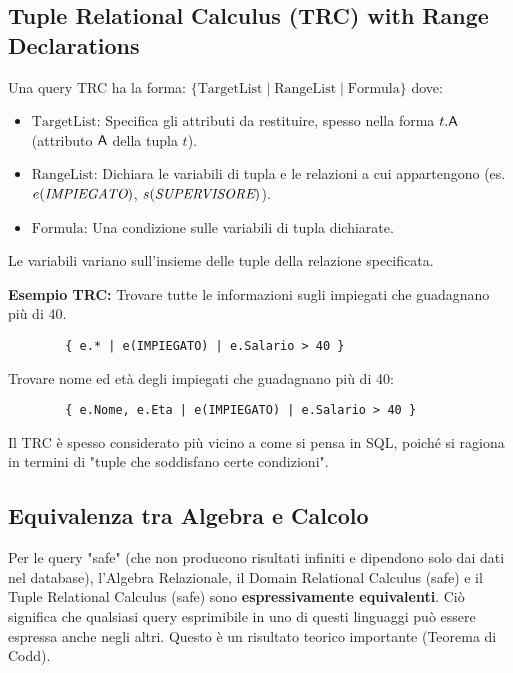 	\subsection{Tuple Relational Calculus (TRC) with Range Declarations}
	Una query TRC ha la forma:
	$\{ \text{TargetList} \mid \text{RangeList} \mid \text{Formula} \}$
	dove:
	\begin{itemize}
		\item $\text{TargetList}$: Specifica gli attributi da restituire, spesso nella forma $t.\textsf{A}$ (attributo $\textsf{A}$ della tupla $t$).
		\item $\text{RangeList}$: Dichiara le variabili di tupla e le relazioni a cui appartengono (es. $e(\textit{IMPIEGATO})$, $s(\textit{SUPERVISORE})$).
		\item $\text{Formula}$: Una condizione sulle variabili di tupla dichiarate.
	\end{itemize}
	Le variabili variano sull'insieme delle tuple della relazione specificata.
	
	\textbf{Esempio TRC:} Trovare tutte le informazioni sugli impiegati che guadagnano più di 40.
	\begin{verbatim}
		{ e.* | e(IMPIEGATO) | e.Salario > 40 }
	\end{verbatim}
	Trovare nome ed età degli impiegati che guadagnano più di 40:
	\begin{verbatim}
		{ e.Nome, e.Eta | e(IMPIEGATO) | e.Salario > 40 }
	\end{verbatim}
	Il TRC è spesso considerato più vicino a come si pensa in SQL, poiché si ragiona in termini di "tuple che soddisfano certe condizioni".
	
	\subsection{Equivalenza tra Algebra e Calcolo}
	Per le query "safe" (che non producono risultati infiniti e dipendono solo dai dati nel database), l'Algebra Relazionale, il Domain Relational Calculus (safe) e il Tuple Relational Calculus (safe) sono \textbf{espressivamente equivalenti}. Ciò significa che qualsiasi query esprimibile in uno di questi linguaggi può essere espressa anche negli altri. Questo è un risultato teorico importante (Teorema di Codd).
	
